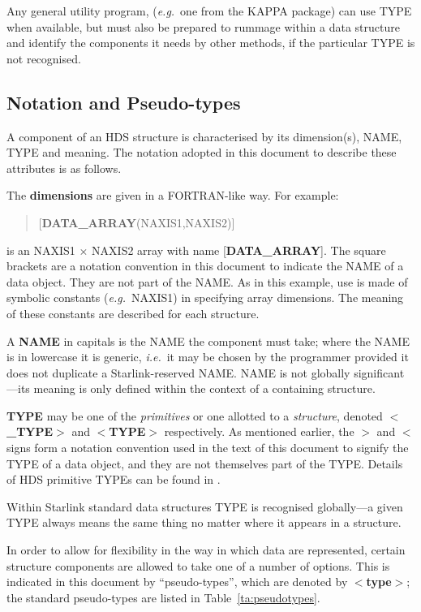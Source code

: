 \documentclass[twoside,11pt,nolof,noabs]{starlink}
\begin{document}
Any general utility program, (\textit{e.g.}\  one from the
{\small KAPPA} package) can use TYPE
when available, but must also be prepared
to rummage within a data structure
and identify the components it needs by other methods, if the particular
TYPE is not recognised.

\subsection{Notation and Pseudo-types\label{se:notation}}

A component of an HDS structure is characterised
by its dimension(s), NAME, TYPE and meaning.  The
notation adopted in this document to describe these
attributes is as follows.

The \textbf{dimensions} are given in a FORTRAN-like way.
For example:
\begin{verse}
   {[}\textbf{DATA\_ARRAY}(NAXIS1,NAXIS2){]}
\end{verse}
is an NAXIS1 $\times$ NAXIS2 array with name
{[}\textbf{DATA\_ARRAY}{]}.
The square brackets are a notation convention
in this document to indicate the
NAME of a data object. They are not part of the NAME.
As in this example, use is made of symbolic constants (\textit{e.g.}\  NAXIS1)
in specifying array dimensions.
The meaning of these constants are described for each structure.

A \textbf{NAME} in capitals is the NAME the component must take; where the NAME
is in lowercase it is generic, \textit{i.e.}\  it may be chosen by the
programmer provided it does not duplicate a Starlink-reserved NAME.
NAME is not globally significant---its meaning is only defined within
the context of a containing structure.

\textbf{TYPE} may be one of the \textit{primitives} or one
allotted to a \textit{structure},
denoted $<$\textbf{\_TYPE}$>$ and
$<$\textbf{TYPE}$>$ respectively. As mentioned earlier, the $>$ and
$<$ signs form a notation convention used in the text of this
document to signify the TYPE of a data object, and they are not
themselves part of the TYPE. Details of
HDS primitive TYPEs can be found in .

Within Starlink standard data structures TYPE is
recognised globally---a given TYPE always means the same thing no
matter where it appears in a structure.

In order to allow for
flexibility in the way in which data are represented, certain structure
components are allowed to take one of a number of options. This is
indicated in this document by ``pseudo-types'',
which are denoted by $<$\textbf{type}$>$;
the standard pseudo-types are listed in Table~\ref{ta:pseudotypes}.
\end{document}
